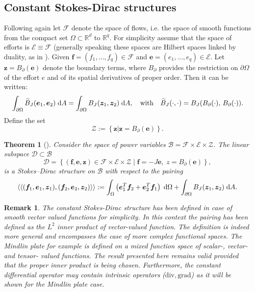 \documentclass[preprint,12pt]{elsarticle}
\newtheorem{theorem}{Theorem}
\newtheorem{remark}{Remark}
\begin{document}
{\subsection{Constant Stokes-Dirac structures}
Following again \cite{MacchelliModelling} let $\mathcal{F}$ denote the space of flows, i.e. the space of smooth functions from the compact set $\Omega \subset \mathbb{R}^d$ to $\mathbb{R}^q$. For simplicity assume that  the space of efforts is $\mathcal{E} \equiv \mathcal{F}$ (generally speaking these spaces are Hilbert spaces linked by duality, as in \cite{Villegas}). Given $\bm{f} = (f_1, \dots, f_q) \in \mathcal{F}$ and $\bm{e} = (e_1, \dots, e_q) \in \mathcal{E}$. Let $\bm{z} = B_\partial(\bm{e})$ denote the boundary terms, where $B_\partial$ provides the restriction on $\partial\Omega$ of the effort $e$ and of its spatial derivatives of proper order. Then it can be written:
\begin{equation}
\int_{\partial \Omega} \widetilde{B}_J(\bm{e}_1, \bm{e}_2) \d{A} = \int_{\partial \Omega} B_J(\bm{z}_1, \bm{z}_2) \d{A}, \quad \text{with} \quad  \widetilde{B}_J(\cdot, \cdot) = B_J(B_{\partial}(\cdot), \, B_{\partial}(\cdot)).
\end{equation}
Define the set
\begin{equation}
	\mathcal{Z} := \left\{ \bm{z} \vert \bm{z} = B_{\partial}(\bm{e})  \right\}.
\end{equation}
\begin{theorem}[\cite{MacchelliModelling}]
	\label{th:StokesDirac}
Consider the space of power variables $\mathcal{B} = \mathcal{F} \times \mathcal{E} \times \mathcal{Z}$. The linear subspace $\mathcal{D} \subset \mathcal{B}$
\begin{equation}
\mathcal{D} = \left\{ (\bm{f}, \bm{e}, \bm{z}) \in  \mathcal{F} \times \mathcal{E} \times \mathcal{Z} \; \vert \; \bm{f} = -J \bm{e}, \; z = B_\partial(\bm{e}) \right\},
\end{equation}
is a Stokes–Dirac structure on $\mathcal{B}$ with respect to the pairing
\begin{equation}
\left\langle \left\langle (\bm{f}_1, \bm{e}_1, \bm{z}_1), (\bm{f}_2, \bm{e}_2, \bm{z}_2) \right\rangle \right\rangle  := \int_{\Omega} \left( \bm{e}_1^T \bm{f}_2 + \bm{e}_2^T \bm{f}_1 \right) \d\Omega + \int_{\partial \Omega} B_J(\bm{z}_1, \bm{z}_2) \d{A}.
\end{equation}
\end{theorem}
\begin{remark}
The constant Stokes-Dirac structure has been defined in case of smooth vector valued functions for simplicity. In this context the pairing has been defined as the $L^2$ inner product of vector-valued function. The definition is indeed more general and encompasses the case of more complex functional spaces. The Mindlin plate for example is defined on a mixed function space of scalar-, vector- and tensor- valued functions. The result presented here remains valid provided that the proper inner product is being chosen. Furthermore, the constant differential operator may contain intrinsic operators ($\mathrm{div}, \mathrm{grad}$) as it will be shown for the Mindlin plate case.
\end{remark}
}
\end{document}
